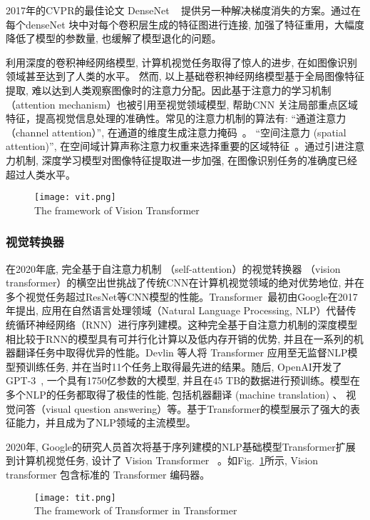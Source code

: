 2017年的CVPR的最佳论文 DenseNet ~\cite{huang2017densely} 提供另一种解决梯度消失的方案。通过在每个denseNet 块中对每个卷积层生成的特征图进行连接, 加强了特征重用，大幅度降低了模型的参数量, 也缓解了模型退化的问题。 \par
利用深度的卷积神经网络模型, 计算机视觉任务取得了惊人的进步, 在如图像识别领域甚至达到了人类的水平。 然而, 以上基础卷积神经网络模型基于全局图像特征提取, 难以达到人类观察图像时的注意力分配。因此基于注意力的学习机制 （attention mechanism）也被引用至视觉领域模型, 帮助CNN 关注局部重点区域特征，提高视觉信息处理的准确性。常见的注意力机制的算法有: ``通道注意力（channel attention）'', 在通道的维度生成注意力掩码~\cite{hu2018squeeze,liu2022spatial, zhang2018context,gao2019global,yang2020gated, chen2019you}。 ``空间注意力 (spatial attention)'', 在空间域计算声称注意力权重来选择重要的区域特征~\cite{wang2018non,gregor2015draw,mnih2014recurrent, jaderberg2015spatial}。通过引进注意力机制, 深度学习模型对图像特征提取进一步加强, 在图像识别任务的准确度已经超过人类水平。
\begin{figure}[!htp]
    \centering
    \texttt{[image: vit.png]} \\
      {The framework of Vision Transformer}
   \label{fig:vit}
  \end{figure}


\subsubsection{视觉转换器}
在2020年底, 完全基于自注意力机制 （self-attention）的视觉转换器 （vision transformer）的横空出世挑战了传统CNN在计算机视觉领域的绝对优势地位, 并在多个视觉任务超过ResNet等CNN模型的性能。Transformer~\cite{vaswani2017attention}最初由Google在2017年提出, 应用在自然语言处理领域（Natural Language Processing, NLP）代替传统循环神经网络（RNN）进行序列建模。这种完全基于自注意力机制的深度模型相比较于RNN的模型具有可并行化计算以及低内存开销的优势, 并且在一系列的机器翻译任务中取得优异的性能。Devlin 等人将 Transformer \cite{devlin2018bert} 应用至无监督NLP模型预训练任务, 并在当时11个任务上取得最先进的结果。随后, OpenAI开发了GPT-3~\cite{brown2020language}, 一个具有1750亿参数的大模型, 并且在45 TB的数据进行预训练。模型在多个NLP的任务都取得了极佳的性能, 包括机器翻译 (machine translation) 、 视觉问答（visual question answering）等。基于Transformer的模型展示了强大的表征能力，并且成为了NLP领域的主流模型。\par

2020年, Google的研究人员首次将基于序列建模的NLP基础模型Transformer扩展到计算机视觉任务, 设计了 Vision Transformer~\cite{dosovitskiy2020image} 。如Fig.~\ref{fig:vit}所示, Vision transformer 包含标准的 Transformer 编码器。
\begin{figure}[!htp]
    \centering
    \texttt{[image: tit.png]} \\
      {The framework of  Transformer in Transformer}
   \label{fig:tit}
  \end{figure}

